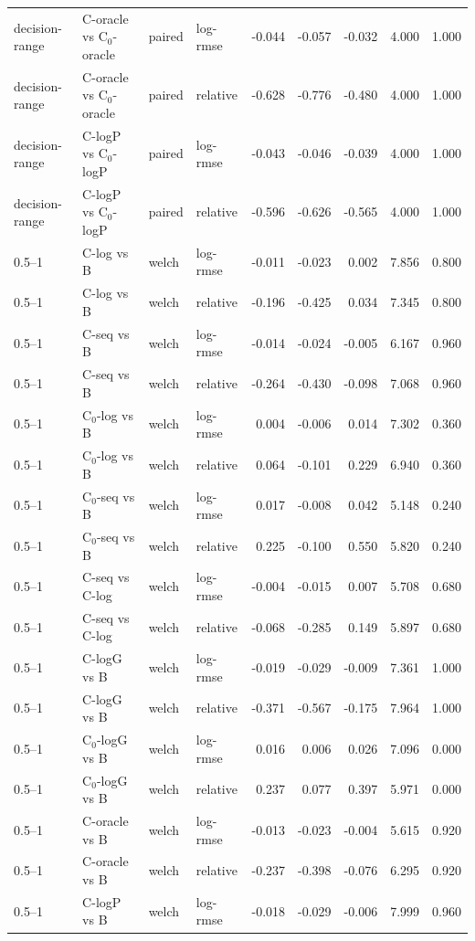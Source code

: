 \begin{longtable}{llllrrrrr}
decision-range & C-oracle vs C$_0$-oracle & paired & log-rmse & -0.044 & -0.057 & -0.032 & 4.000 & 1.000 \\
decision-range & C-oracle vs C$_0$-oracle & paired & relative & -0.628 & -0.776 & -0.480 & 4.000 & 1.000 \\
decision-range & C-logP vs C$_0$-logP & paired & log-rmse & -0.043 & -0.046 & -0.039 & 4.000 & 1.000 \\
decision-range & C-logP vs C$_0$-logP & paired & relative & -0.596 & -0.626 & -0.565 & 4.000 & 1.000 \\
0.5–1 & C-log vs B & welch & log-rmse & -0.011 & -0.023 & 0.002 & 7.856 & 0.800 \\
0.5–1 & C-log vs B & welch & relative & -0.196 & -0.425 & 0.034 & 7.345 & 0.800 \\
0.5–1 & C-seq vs B & welch & log-rmse & -0.014 & -0.024 & -0.005 & 6.167 & 0.960 \\
0.5–1 & C-seq vs B & welch & relative & -0.264 & -0.430 & -0.098 & 7.068 & 0.960 \\
0.5–1 & C$_0$-log vs B & welch & log-rmse & 0.004 & -0.006 & 0.014 & 7.302 & 0.360 \\
0.5–1 & C$_0$-log vs B & welch & relative & 0.064 & -0.101 & 0.229 & 6.940 & 0.360 \\
0.5–1 & C$_0$-seq vs B & welch & log-rmse & 0.017 & -0.008 & 0.042 & 5.148 & 0.240 \\
0.5–1 & C$_0$-seq vs B & welch & relative & 0.225 & -0.100 & 0.550 & 5.820 & 0.240 \\
0.5–1 & C-seq vs C-log & welch & log-rmse & -0.004 & -0.015 & 0.007 & 5.708 & 0.680 \\
0.5–1 & C-seq vs C-log & welch & relative & -0.068 & -0.285 & 0.149 & 5.897 & 0.680 \\
0.5–1 & C-logG vs B & welch & log-rmse & -0.019 & -0.029 & -0.009 & 7.361 & 1.000 \\
0.5–1 & C-logG vs B & welch & relative & -0.371 & -0.567 & -0.175 & 7.964 & 1.000 \\
0.5–1 & C$_0$-logG vs B & welch & log-rmse & 0.016 & 0.006 & 0.026 & 7.096 & 0.000 \\
0.5–1 & C$_0$-logG vs B & welch & relative & 0.237 & 0.077 & 0.397 & 5.971 & 0.000 \\
0.5–1 & C-oracle vs B & welch & log-rmse & -0.013 & -0.023 & -0.004 & 5.615 & 0.920 \\
0.5–1 & C-oracle vs B & welch & relative & -0.237 & -0.398 & -0.076 & 6.295 & 0.920 \\
0.5–1 & C-logP vs B & welch & log-rmse & -0.018 & -0.029 & -0.006 & 7.999 & 0.960 \\

\end{longtable}
